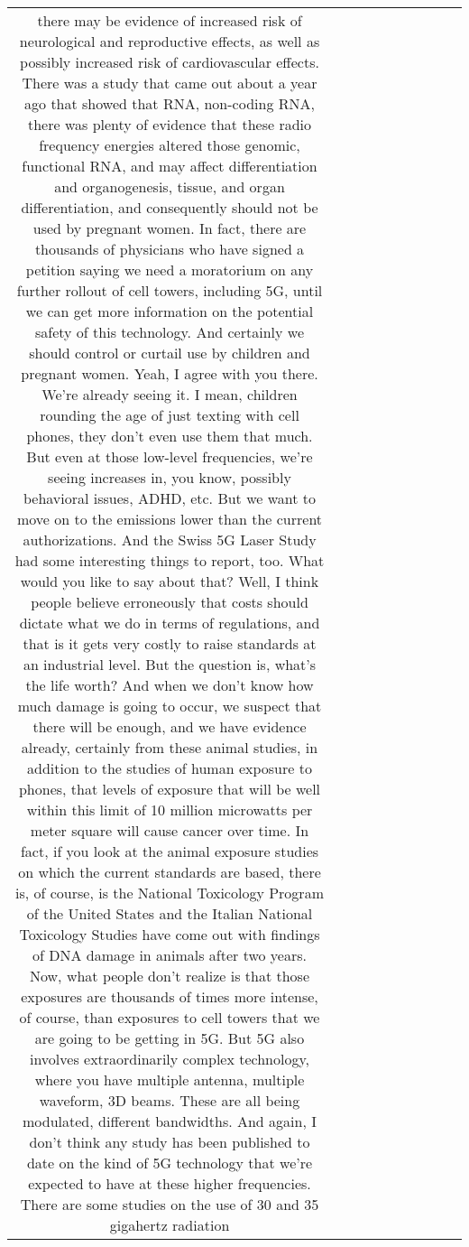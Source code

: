 \begin{table}[h!]
\begin{tabular}{|c|c|c|c|c|c|c|c|c|c|}
there may be evidence of increased risk of neurological and reproductive effects,
as well as possibly increased risk of cardiovascular effects.
There was a study that came out about a year ago that showed that RNA, non-coding RNA,
there was plenty of evidence that these radio frequency energies altered those genomic, functional RNA,
and may affect differentiation and organogenesis, tissue, and organ differentiation,
and consequently should not be used by pregnant women.
In fact, there are thousands of physicians who have signed a petition saying we need a moratorium
on any further rollout of cell towers, including 5G,
until we can get more information on the potential safety of this technology.
And certainly we should control or curtail use by children and pregnant women.
Yeah, I agree with you there.
We're already seeing it.
I mean, children rounding the age of just texting with cell phones,
they don't even use them that much.
But even at those low-level frequencies, we're seeing increases in, you know,
possibly behavioral issues, ADHD, etc.
But we want to move on to the emissions lower than the current authorizations.
And the Swiss 5G Laser Study had some interesting things to report, too.
What would you like to say about that?
Well, I think people believe erroneously that costs should dictate what we do in terms of regulations,
and that is it gets very costly to raise standards at an industrial level.
But the question is, what's the life worth?
And when we don't know how much damage is going to occur, we suspect that there will be enough,
and we have evidence already, certainly from these animal studies,
in addition to the studies of human exposure to phones,
that levels of exposure that will be well within this limit of 10 million microwatts per meter square
will cause cancer over time.
In fact, if you look at the animal exposure studies on which the current standards are based,
there is, of course, is the National Toxicology Program of the United States
and the Italian National Toxicology Studies have come out with findings of DNA damage in animals after two years.
Now, what people don't realize is that those exposures are thousands of times more intense, of course,
than exposures to cell towers that we are going to be getting in 5G.
But 5G also involves extraordinarily complex technology,
where you have multiple antenna, multiple waveform, 3D beams.
These are all being modulated, different bandwidths.
And again, I don't think any study has been published to date on the kind of 5G technology
that we're expected to have at these higher frequencies.
There are some studies on the use of 30 and 35 gigahertz radiation

\end{tabular}
\end{table}
